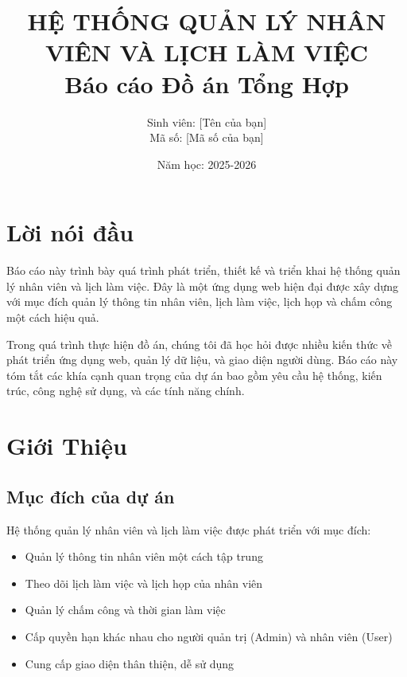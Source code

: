 \documentclass[12pt,a4paper]{report}
\title{
    \textbf{HỆ THỐNG QUẢN LÝ NHÂN VIÊN VÀ LỊCH LÀM VIỆC}\\
    \vspace{1cm}
    \large Báo cáo Đồ án Tổng Hợp
}
\author{Sinh viên: [Tên của bạn]\\[0.5cm]Mã số: [Mã số của bạn]}
\date{Năm học: 2025-2026}
\begin{document}
\maketitle

\newpage

\tableofcontents

\newpage

\section*{Lời nói đầu}

Báo cáo này trình bày quá trình phát triển, thiết kế và triển khai hệ thống quản lý nhân viên và lịch làm việc. Đây là một ứng dụng web hiện đại được xây dựng với mục đích quản lý thông tin nhân viên, lịch làm việc, lịch họp và chấm công một cách hiệu quả.

Trong quá trình thực hiện đồ án, chúng tôi đã học hỏi được nhiều kiến thức về phát triển ứng dụng web, quản lý dữ liệu, và giao diện người dùng. Báo cáo này tóm tắt các khía cạnh quan trọng của dự án bao gồm yêu cầu hệ thống, kiến trúc, công nghệ sử dụng, và các tính năng chính.

\newpage

\section{Giới Thiệu}

\subsection{Mục đích của dự án}

Hệ thống quản lý nhân viên và lịch làm việc được phát triển với mục đích:
\begin{itemize}
    \item Quản lý thông tin nhân viên một cách tập trung
    \item Theo dõi lịch làm việc và lịch họp của nhân viên
    \item Quản lý chấm công và thời gian làm việc
    \item Cấp quyền hạn khác nhau cho người quản trị (Admin) và nhân viên (User)
    \item Cung cấp giao diện thân thiện, dễ sử dụng
\end{itemize}
\end{document}
